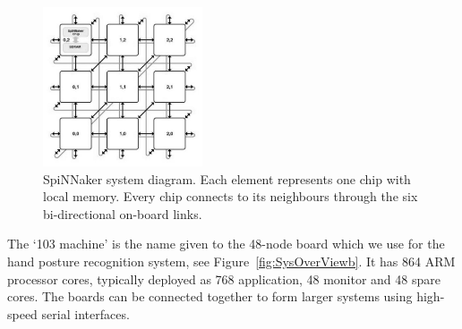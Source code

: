 \documentclass[journal]{journal}
\begin{document}
\begin{figure}
\centering
	\includegraphics[width=0.42\textwidth]{pics/mesh_ctiff.jpg}
	\caption{SpiNNaker system diagram.
	Each element represents one chip with local memory.
	Every chip connects to its neighbours through the six bi-directional on-board links. }
	\label{fig:sysdia}
\end{figure}

%

The `103 machine' is the name given to the 48-node board which we use for the hand posture recognition system, see Figure~\ref{fig:SysOverViewb}.
It has 864 ARM processor cores, typically deployed as 768 application, 48 monitor and 48 spare cores. 
The boards can be connected together to form larger systems using high-speed serial interfaces. 

\end{document}
